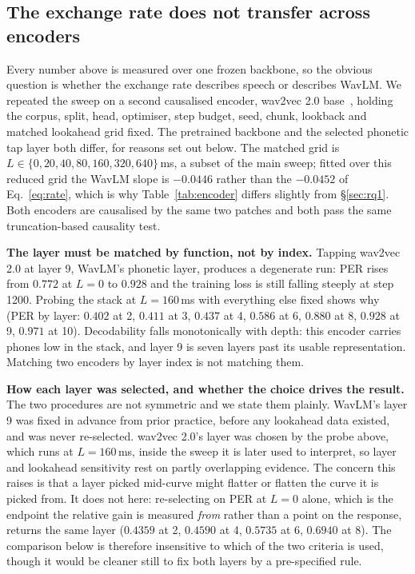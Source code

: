 \documentclass[journal]{IEEEtran}
\begin{document}
\subsection{The exchange rate does not transfer across encoders}
\label{sec:encoder}

Every number above is measured over one frozen backbone, so the obvious
question is whether the exchange rate describes speech or describes WavLM. We
repeated the sweep on a second causalised encoder, wav2vec 2.0
base~\cite{wav2vec2}, holding the corpus, split, head, optimiser, step budget,
seed, chunk, lookback and matched lookahead grid fixed. The pretrained
backbone and the selected phonetic tap layer both differ, for reasons set out
below. The matched grid is $L\in\{0,20,40,80,160,320,640\}$\,ms, a subset of the main
sweep; fitted over this reduced grid the WavLM slope is $-0.0446$ rather than
the $-0.0452$ of Eq.~\ref{eq:rate}, which is why Table~\ref{tab:encoder}
differs slightly from \S\ref{sec:rq1}. Both encoders are causalised by the same
two patches and both pass the same truncation-based causality test.

\textbf{The layer must be matched by function, not by index.} Tapping
wav2vec 2.0 at layer 9, WavLM's phonetic layer, produces a degenerate
run: PER rises from $0.772$ at $L{=}0$ to $0.928$ and the training loss is
still falling steeply at step 1200. Probing the stack at $L{=}160$\,ms with
everything else fixed shows why (PER by layer: $0.402$ at 2, $0.411$ at 3,
$0.437$ at 4, $0.586$ at 6, $0.880$ at 8, $0.928$ at 9, $0.971$ at 10).
Decodability falls monotonically with depth: this encoder carries phones low
in the stack, and layer 9 is seven layers past its usable representation.
Matching two encoders by layer index is not matching them.

\textbf{How each layer was selected, and whether the choice drives the
result.} The two procedures are not symmetric and we state them plainly.
WavLM's layer 9 was fixed in advance from prior practice, before any lookahead
data existed, and was never re-selected. wav2vec 2.0's layer was chosen by the
probe above, which runs at $L{=}160$\,ms, inside the sweep it is later used
to interpret, so layer and lookahead sensitivity rest on partly overlapping
evidence. The concern this raises is that a layer picked mid-curve might
flatter or flatten the curve it is picked from. It does not here: re-selecting
on PER at $L{=}0$ alone, which is the endpoint the relative gain is measured
\emph{from} rather than a point on the response, returns the same layer
($0.4359$ at 2, $0.4590$ at 4, $0.5735$ at 6, $0.6940$ at 8). The comparison
below is therefore insensitive to which of the two criteria is used, though it
would be cleaner still to fix both layers by a pre-specified rule.
\end{document}
